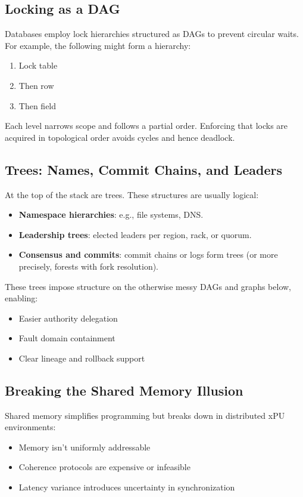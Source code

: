 \documentclass[../../../OAE-SPEC-MAIN.tex]{subfiles}
\begin{document}
\subsection*{Locking as a DAG}
Databases employ lock hierarchies structured as DAGs to prevent circular waits. For example, the following might form a hierarchy:
\begin{enumerate}[label=\arabic*.]
  \item Lock table
  \item Then row
  \item Then field
\end{enumerate}
Each level narrows scope and follows a partial order. Enforcing that locks are acquired in topological order avoids cycles and hence deadlock.

\subsection{Trees: Names, Commit Chains, and Leaders}
At the top of the stack are trees. These structures are usually logical:
\begin{itemize}[noitemsep]
  \item \textbf{Namespace hierarchies}: e.g., file systems, DNS.
  \item \textbf{Leadership trees}: elected leaders per region, rack, or quorum.
  \item \textbf{Consensus and commits}: commit chains or logs form trees (or more precisely, forests with fork resolution).
\end{itemize}

These trees impose structure on the otherwise messy DAGs and graphs below, enabling:
\begin{itemize}[noitemsep]
  \item Easier authority delegation
  \item Fault domain containment
  \item Clear lineage and rollback support
\end{itemize}

\subsection{Breaking the Shared Memory Illusion}
Shared memory simplifies programming but breaks down in distributed xPU environments:
\begin{itemize}[noitemsep]
  \item Memory isn’t uniformly addressable
  \item Coherence protocols are expensive or infeasible
  \item Latency variance introduces uncertainty in synchronization
\end{itemize}
\end{document}
